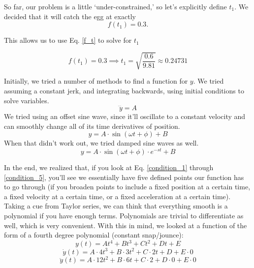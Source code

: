 \documentclass[nofoot,pdf-a,balance,colorlinks,upint,subscriptcorrection,varvw,mathalfa=cal=boondoxo]{asmeconf}
\begin{document}
         So far, our problem is a little `under-constrained,' so let's explicitly define $t_1$. We decided that it will catch the egg at exactly
	\begin{equation}
	f\left(t_1\right) = 0.3. 
	\end{equation}

	This allows us to use Eq. \eqref{f_t} to solve for $t_1$

         \begin{equation} 
             f(t_1) = 0.3 \implies t_1 = \sqrt{\frac{0.6}{9.81}} \approx 0.24731
         \end{equation}
     
       Initially, we tried a number of methods to find a function for $y$. We tried assuming a constant jerk, and integrating backwards, using initial conditions to solve variables. 
    \begin{equation*}
        \dddot{y} = A
    \end{equation*}
        We tried using an offset sine wave, since it'll oscillate to a constant velocity and can smoothly change all of its time derivatives of position.
    \begin{equation*}
        y = A \cdot \sin{\left(\omega t + \phi\right)} + B
    \end{equation*}
        When that didn't work out, we tried damped sine waves as well.
    \begin{equation*}
        y = A \cdot \sin{\left(\omega t + \phi\right)}\cdot e^{-st} + B
    \end{equation*}

    In the end, we realized that, if you look at Eq. \eqref{condition_1} through \eqref{condition_5}, you'll see we essentially have five defined points our function has to go through (if you broaden points to include a fixed position at a certain time, a fixed velocity at a certain time, or a fixed acceleration at a certain time). Taking a cue from Taylor series, we can think that everything smooth is a polynomial if you have enough terms. Polynomials are trivial to differentiate as well, which is very convenient.  With this in mind, we looked at a function of the form of a fourth degree polynomial (constant snap/jounce):
    \begin{equation}\label{form_1}
        y\left(t\right) = At^4 + Bt^3 + Ct^2 + Dt + E
    \end{equation}
    \begin{equation}\label{form_2}
        \dot{y}\left(t\right) = A\cdot4t^3 + B\cdot 3t^2 + C \cdot 2t + D + E\cdot 0
    \end{equation}
    \begin{equation}\label{form_3}
        \ddot{y}\left(t\right) = A\cdot12t^2 + B\cdot 6t + C \cdot 2 + D\cdot0 + E\cdot 0
    \end{equation}
\end{document}
